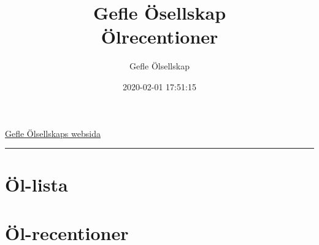 \documentclass[11pt]{article}
\author{Gefle Ölsellskap}
\date{2020-02-01 17:51:15}
\title{Gefle Ösellskap\\\medskip
\large Ölrecentioner}
\begin{document}
\maketitle
\begin{center}
\href{http://www.gefleolsellskap.com}{Gefle Ölsellskaps websida}
\end{center}

\noindent\rule{\textwidth}{0.5pt}

\section*{Öl-lista}
\label{sec:org6f2b92d}

\section*{Öl-recentioner}
\label{sec:org94f8745}
\end{document}

